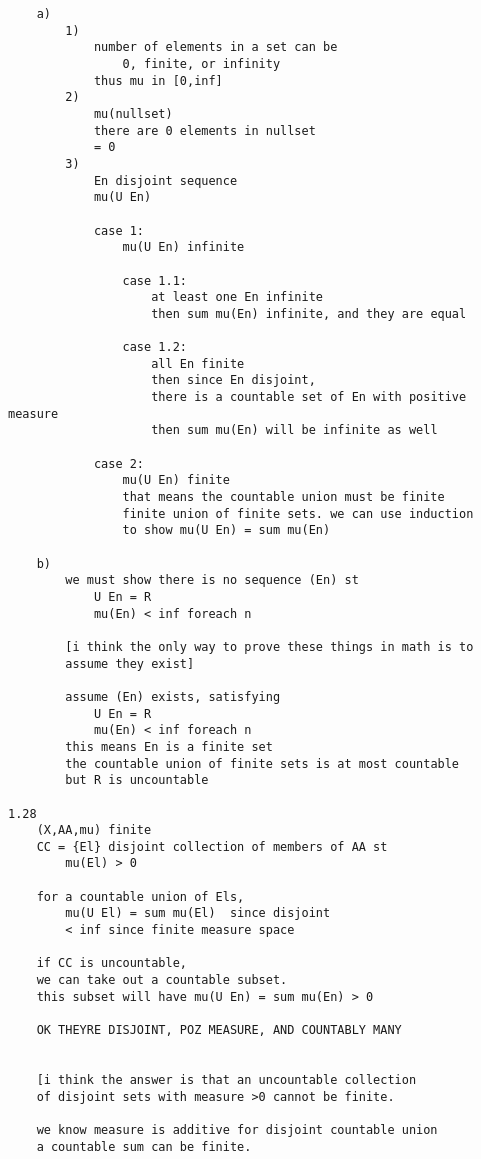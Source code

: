 \documentclass{article}
\begin{document}
\begin{flushleft}
\begin{verbatim}
    a)
        1)
            number of elements in a set can be 
                0, finite, or infinity 
            thus mu in [0,inf]
        2)
            mu(nullset)
            there are 0 elements in nullset 
            = 0
        3)
            En disjoint sequence 
            mu(U En)

            case 1:
                mu(U En) infinite 
                
                case 1.1:
                    at least one En infinite 
                    then sum mu(En) infinite, and they are equal 

                case 1.2:
                    all En finite 
                    then since En disjoint, 
                    there is a countable set of En with positive measure 
                    then sum mu(En) will be infinite as well 
                
            case 2:
                mu(U En) finite 
                that means the countable union must be finite 
                finite union of finite sets. we can use induction 
                to show mu(U En) = sum mu(En)

    b)
        we must show there is no sequence (En) st 
            U En = R 
            mu(En) < inf foreach n 

        [i think the only way to prove these things in math is to
        assume they exist]

        assume (En) exists, satisfying 
            U En = R 
            mu(En) < inf foreach n 
        this means En is a finite set 
        the countable union of finite sets is at most countable 
        but R is uncountable 

1.28
    (X,AA,mu) finite 
    CC = {El} disjoint collection of members of AA st 
        mu(El) > 0 

    for a countable union of Els, 
        mu(U El) = sum mu(El)  since disjoint 
        < inf since finite measure space 

    if CC is uncountable, 
    we can take out a countable subset. 
    this subset will have mu(U En) = sum mu(En) > 0 

    OK THEYRE DISJOINT, POZ MEASURE, AND COUNTABLY MANY 


    [i think the answer is that an uncountable collection
    of disjoint sets with measure >0 cannot be finite.
    
    we know measure is additive for disjoint countable union
    a countable sum can be finite. 
    

\end{verbatim}
\end{flushleft}
\end{document}
